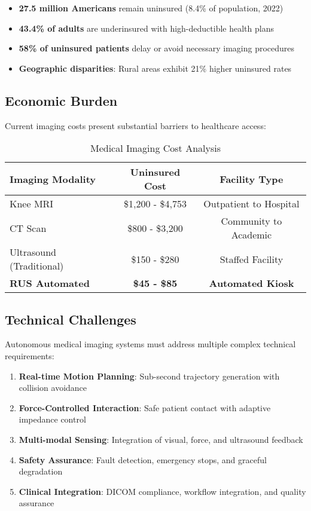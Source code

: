 \begin{itemize}
    \item \textbf{27.5 million Americans} remain uninsured (8.4\% of population, 2022)
    \item \textbf{43.4\% of adults} are underinsured with high-deductible health plans
    \item \textbf{58\% of uninsured patients} delay or avoid necessary imaging procedures
    \item \textbf{Geographic disparities}: Rural areas exhibit 21\% higher uninsured rates
\end{itemize}

\subsection{Economic Burden}

Current imaging costs present substantial barriers to healthcare access:

\begin{table}[H]
\centering
\caption{Medical Imaging Cost Analysis}
\label{tab:imaging_costs}
\begin{tabular}{@{}lcc@{}}
\toprule
\textbf{Imaging Modality} & \textbf{Uninsured Cost} & \textbf{Facility Type} \\
\midrule
Knee MRI & \$1,200 - \$4,753 & Outpatient to Hospital \\
CT Scan & \$800 - \$3,200 & Community to Academic \\
Ultrasound (Traditional) & \$150 - \$280 & Staffed Facility \\
\textbf{RUS Automated} & \textbf{\$45 - \$85} & \textbf{Automated Kiosk} \\
\bottomrule
\end{tabular}
\end{table}

\subsection{Technical Challenges}

Autonomous medical imaging systems must address multiple complex technical requirements:

\begin{enumerate}
    \item \textbf{Real-time Motion Planning}: Sub-second trajectory generation with collision avoidance
    \item \textbf{Force-Controlled Interaction}: Safe patient contact with adaptive impedance control
    \item \textbf{Multi-modal Sensing}: Integration of visual, force, and ultrasound feedback
    \item \textbf{Safety Assurance}: Fault detection, emergency stops, and graceful degradation
    \item \textbf{Clinical Integration}: DICOM compliance, workflow integration, and quality assurance
\end{enumerate}

